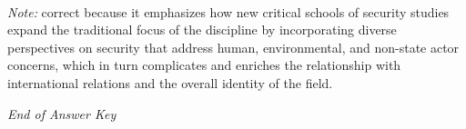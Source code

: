 \documentclass[12pt]{article}
\begin{document}
\begin{enumerate}[label=\arabic*.]
\\ \textit{Note:} correct because it emphasizes how new critical schools of security studies expand the traditional focus of the discipline by incorporating diverse perspectives on security that address human, environmental, and non-state actor concerns, which in turn complicates and enriches the relationship with international relations and the overall identity of the field.
\end{enumerate}

\vfill
\noindent\textit{End of Answer Key}
\end{document}
